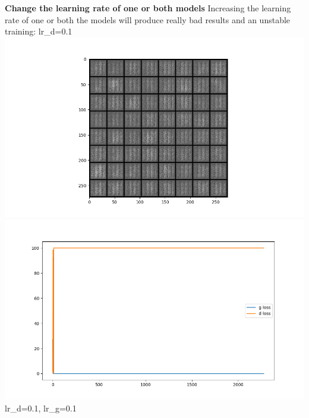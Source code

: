 \textbf{Change the learning rate of one or both models} Increasing the
learning rate of one or both the models will produce really bad results
and an unstable training: lr\_d=0.1
\includegraphics{./images/Pasted image 20231228114943.png}\includegraphics{./images/Pasted image 20231228115259.png}
lr\_d=0.1, lr\_g=0.1
